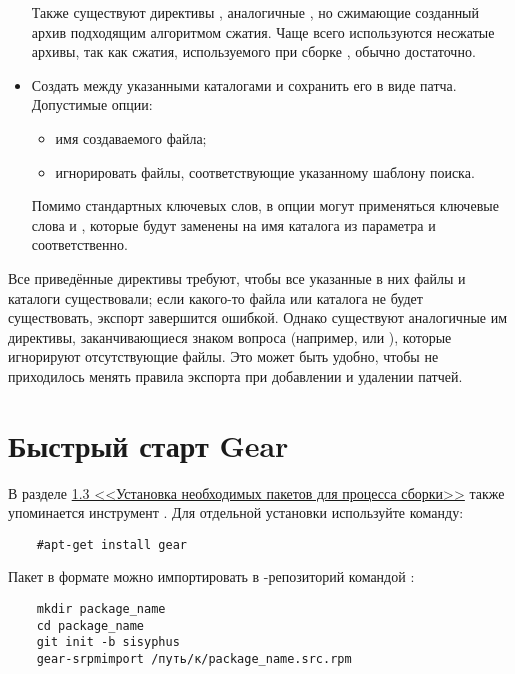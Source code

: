 \begin{itemize}
	Также существуют директивы , аналогичные , но сжимающие созданный архив подходящим алгоритмом сжатия. Чаще всего используются несжатые архивы, так как сжатия, используемого при сборке , обычно достаточно.
	
	\item  \textbf{}
	
	Создать  между указанными каталогами и сохранить его в виде патча. Допустимые опции:
	\begin{itemize}
		\item {} имя создаваемого файла;
		\item {} игнорировать файлы, соответствующие указанному шаблону поиска.
	\end{itemize}
	
	Помимо стандартных ключевых слов, в опции  могут применяться ключевые слова  и , которые будут заменены на имя каталога из параметра  и  соответственно. 
\end{itemize}

Все приведённые директивы требуют, чтобы все указанные в них файлы и каталоги существовали; если какого-то файла или каталога не будет существовать, экспорт завершится ошибкой. Однако существуют аналогичные им директивы, заканчивающиеся знаком вопроса (например,  или ), которые игнорируют отсутствующие файлы. Это может быть удобно, чтобы не приходилось менять правила экспорта при добавлении и удалении патчей.


\section{Быстрый старт Gear}

В разделе \hyperlink{1.3}{1.3 <<Установка необходимых пакетов для процесса сборки>>} 
также упоминается инструмент . Для отдельной установки используйте команду: 
\begin{verbatim}
	#apt-get install gear
\end{verbatim}


Пакет в формате  можно импортировать в -репозиторий командой :
\begin{verbatim}
	mkdir package_name
	cd package_name
	git init -b sisyphus
	gear-srpmimport /путь/к/package_name.src.rpm
\end{verbatim}

